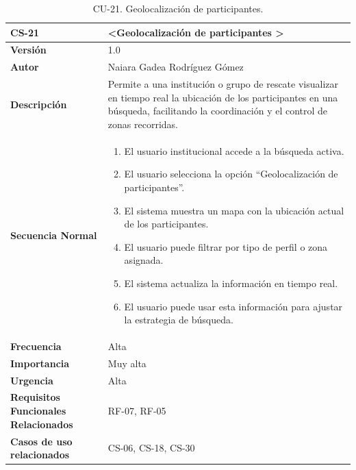 \begin{table}[htbp] %
\centering
\begin{tabular}{ |m{3cm}|m{11cm}|  } 
\hline
\cellcolor[HTML]{B9E3F0}\centering\textbf{CS-21} & \cellcolor[HTML]{B9E3F0}\textbf{\textless Geolocalización de participantes \textgreater}\\

\hline
\cellcolor[HTML]{EFEFEF}\textbf{Versión}             & 1.0  \\
\hline
\cellcolor[HTML]{EFEFEF}\textbf{Autor}                & Naiara Gadea Rodríguez Gómez\\
\hline
\cellcolor[HTML]{EFEFEF}\textbf{Descripción}                & {Permite a una institución o grupo de rescate visualizar en tiempo real la ubicación de los participantes en una búsqueda, facilitando la coordinación y el control de zonas recorridas.}\\
\hline
\cellcolor[HTML]{EFEFEF}\textbf{Secuencia \newline Normal}                &                 
        \begin{enumerate}
			\item El usuario institucional accede a la búsqueda activa.
			\item El usuario selecciona la opción “Geolocalización de participantes”.
			\item El sistema muestra un mapa con la ubicación actual de los participantes.
			\item El usuario puede filtrar por tipo de perfil o zona asignada.
			\item El sistema actualiza la información en tiempo real.
			\item El usuario puede usar esta información para ajustar la estrategia de búsqueda.
		\end{enumerate}\\
\hline
\cellcolor[HTML]{EFEFEF}\textbf{Frecuencia}                & Alta\\
\hline
\cellcolor[HTML]{EFEFEF}\textbf{Importancia}                & Muy alta\\
\hline
\cellcolor[HTML]{EFEFEF}\textbf{Urgencia}                & Alta\\
\hline
\cellcolor[HTML]{EFEFEF}\textbf{Requisitos Funcionales Relacionados}                & {RF-07, RF-05}\\
\hline
\cellcolor[HTML]{EFEFEF}\textbf{Casos de uso relacionados}                & {CS-06, CS-18, CS-30}\\
\hline
\end{tabular}
\caption{CU-21. Geolocalización de participantes.}
\end{table}

